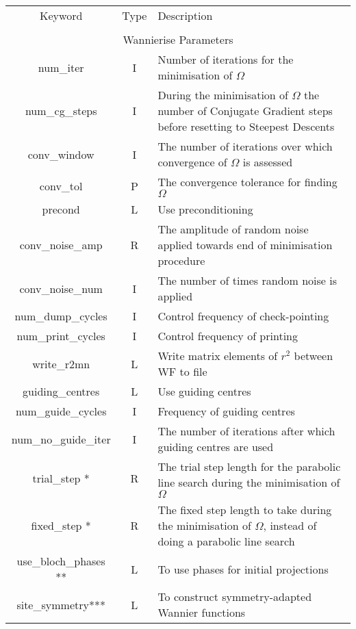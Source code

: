 \begin{table}
\begin{center}
\begin{tabular}{|c|c|p{6cm}|}
\hline
Keyword & Type & Description \\
        &      &             \\
\hline\hline
\multicolumn{3}{|c|}{Wannierise Parameters} \\
\hline
{\sc num\_iter }   & I & Number of iterations for the minimisation
of $\Omega$ \\
{\sc num\_cg\_steps }   & I & During the minimisation
of $\Omega$ the number of Conjugate Gradient steps before resetting to
Steepest Descents \\
{\sc conv\_window }   & I & The number of iterations over which
convergence of $\Omega$ is assessed \\
{\sc conv\_tol }   & P & The convergence tolerance for finding $\Omega$  \\
{\sc precond }   & L & Use preconditioning \\
{\sc conv\_noise\_amp} & R & The amplitude of random noise applied
towards end of minimisation procedure \\
{\sc conv\_noise\_num} & I & The number of times random noise is
applied \\
{\sc num\_dump\_cycles }   & I & Control frequency of check-pointing \\
{\sc num\_print\_cycles }   & I & Control frequency of printing \\
{\sc write\_r2mn }   & L & Write matrix elements of $r^2$ between
WF to file \\
{\sc guiding\_centres }   & L & Use guiding centres \\
{\sc num\_guide\_cycles }   & I & Frequency of guiding centres \\
{\sc num\_no\_guide\_iter }   & I & The number of iterations
after which guiding centres are used\\
{\sc trial\_step }*   & R & The trial step length for the parabolic
line search during the minimisation
of $\Omega$\\
{\sc fixed\_step }*   & R & The fixed step length to take during the minimisation
of $\Omega$, instead of doing a parabolic line search \\
{\sc use\_bloch\_phases }**   & L & To use phases for initial projections \\
{\sc site\_symmetry}***   & L & To construct symmetry-adapted Wannier functions  \\

\end{tabular}
\end{center}
\end{table}
